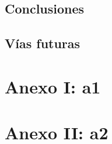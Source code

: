 \documentclass[12pt,a4paper]{article}
\begin{document}
\subsection{Conclusiones}

\subsection{Vías futuras}

\newpage
\appendix
\addappheadtotoc
\appendixpage
\section{Anexo I: a1}\label{anexo1}

\newpage
\section{Anexo II: a2}\label{anexo2}

\newpage
\nocite{*}
\renewcommand\refname{Bibliografía}



\clearpage


\printglossary[type=\acronymtype,style=long,title={Índice de acrónimos}]

\end{document}

